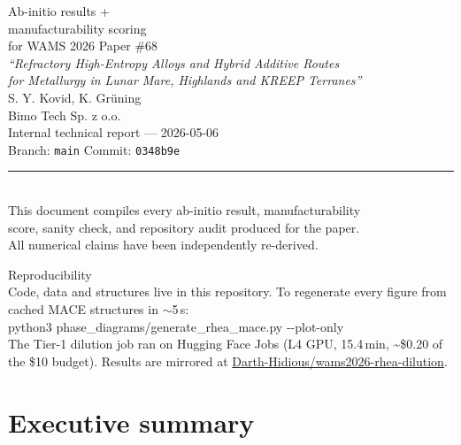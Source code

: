 \documentclass[11pt,a4paper]{article}
\begin{document}
\thispagestyle{empty}
\vspace*{2cm}
\begin{center}
{\GSSemiBold\Huge\color{neutral} Ab-initio results +\\[0.2em]
manufacturability scoring}\\[0.3em]
{\Large\color{accent} for WAMS 2026 Paper \#68}\\[1.2em]
{\large \textit{``Refractory High-Entropy Alloys and Hybrid Additive Routes\\
for Metallurgy in Lunar Mare, Highlands and KREEP Terranes''}}\\[2.4em]
{\large S. Y. Kovid, K. Gr\"uning}\\
{\large Bimo Tech Sp. z o.o.}\\[1em]
{\normalsize Internal technical report --- 2026-05-06}\\
{\normalsize Branch: \texttt{main} \quad Commit: \texttt{0348b9e}}\\[2em]

\rule{0.4\textwidth}{0.4pt}\\[0.6em]
{\small This document compiles every ab-initio result, manufacturability\\
score, sanity check, and repository audit produced for the paper.\\
All numerical claims have been independently re-derived.}
\end{center}

\vfill
\noindent\colorbox{soft}{\parbox{\dimexpr\textwidth-2\fboxsep}{
\GSSemiBold\color{neutral} Reproducibility \\[0.3em]
\rmfamily\normalsize
Code, data and structures live in this repository. To regenerate every
figure from cached MACE structures in $\sim$5\,s:\\[0.3em]
{\ttfamily\small python3 phase\_diagrams/generate\_rhea\_mace.py -{}-plot-only}\\[0.3em]
The Tier-1 dilution job ran on Hugging Face Jobs (L4 GPU, 15.4\,min,
\textasciitilde\$0.20 of the \$10 budget). Results are mirrored at
\href{https://huggingface.co/datasets/Darth-Hidious/wams2026-rhea-dilution}%
{Darth-Hidious/wams2026-rhea-dilution}.
}}
\clearpage

\tableofcontents
\clearpage

\section{Executive summary}
\end{document}
